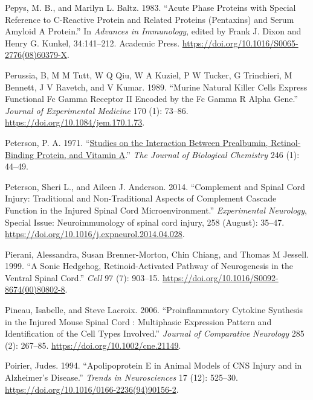 \documentclass[9pt,lineno]{elife}
\newlength{\cslhangindent}
\newlength{\cslentryspacingunit} %
\newenvironment{CSLReferences}[2] %
 {%
  \setlength{\parindent}{0pt}
  \ifodd #1
  \let\oldpar\par
  \def\par{\hangindent=\cslhangindent\oldpar}
  \fi
  \setlength{\parskip}{#2\cslentryspacingunit}
 }%
 {}
\begin{document}
\begin{CSLReferences}{1}{0}
\leavevmode{}%
Pepys, M. B., and Marilyn L. Baltz. 1983. {``Acute {Phase Proteins} with {Special Reference} to {C-Reactive Protein} and {Related Proteins} ({Pentaxins}) and {Serum Amyloid A Protein}.''} In \emph{Advances in {Immunology}}, edited by Frank J. Dixon and Henry G. Kunkel, 34:141--212. {Academic Press}. \url{https://doi.org/10.1016/S0065-2776(08)60379-X}.

\leavevmode{}%
Perussia, B, M M Tutt, W Q Qiu, W A Kuziel, P W Tucker, G Trinchieri, M Bennett, J V Ravetch, and V Kumar. 1989. {``Murine Natural Killer Cells Express Functional {Fc} Gamma Receptor {II} Encoded by the {Fc} Gamma {R} Alpha Gene.''} \emph{Journal of Experimental Medicine} 170 (1): 73--86. \url{https://doi.org/10.1084/jem.170.1.73}.

\leavevmode{}%
Peterson, P. A. 1971. {``\href{https://www.ncbi.nlm.nih.gov/pubmed/5541771}{Studies on the Interaction Between Prealbumin, Retinol-Binding Protein, and Vitamin {A}}.''} \emph{The Journal of Biological Chemistry} 246 (1): 44--49.

\leavevmode{}%
Peterson, Sheri L., and Aileen J. Anderson. 2014. {``Complement and Spinal Cord Injury: {Traditional} and Non-Traditional Aspects of Complement Cascade Function in the Injured Spinal Cord Microenvironment.''} \emph{Experimental Neurology}, Special {Issue}: {Neuroimmunology} of spinal cord injury, 258 (August): 35--47. \url{https://doi.org/10.1016/j.expneurol.2014.04.028}.

\leavevmode{}%
Pierani, Alessandra, Susan Brenner-Morton, Chin Chiang, and Thomas M Jessell. 1999. {``A {Sonic Hedgehog}, {Retinoid-Activated Pathway} of {Neurogenesis} in the {Ventral Spinal Cord}.''} \emph{Cell} 97 (7): 903--15. \url{https://doi.org/10.1016/S0092-8674(00)80802-8}.

\leavevmode{}%
Pineau, Isabelle, and Steve Lacroix. 2006. {``Proinflammatory {Cytokine Synthesis} in the {Injured Mouse Spinal Cord} : {Multiphasic Expression Pattern} and {Identification} of the {Cell Types Involved}.''} \emph{Journal of Comparative Neurology} 285 (2): 267--85. \url{https://doi.org/10.1002/cne.21149}.

\leavevmode{}%
Poirier, Judes. 1994. {``Apolipoprotein {E} in Animal Models of {CNS} Injury and in Alzheimer's Disease.''} \emph{Trends in Neurosciences} 17 (12): 525--30. \url{https://doi.org/10.1016/0166-2236(94)90156-2}.


\end{CSLReferences}
\end{document}
